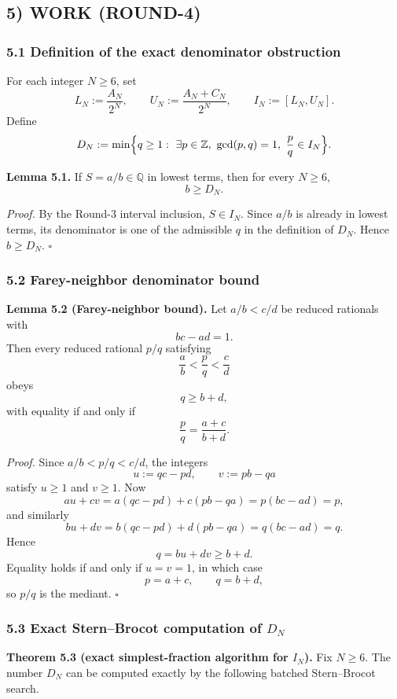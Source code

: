 \subsection*{5) WORK (ROUND-4)}

\subsubsection*{5.1 Definition of the exact denominator obstruction}

For each integer $N\ge 6$, set
\[
L_N:=\frac{A_N}{2^N},\qquad U_N:=\frac{A_N+C_N}{2^N},
\qquad I_N:=[L_N,U_N].
\]
Define
\[
D_N:=\min\Bigl\{q\ge 1:\ \exists p\in\mathbb Z,\ \gcd(p,q)=1,\ \frac pq\in I_N\Bigr\}.
\]

\medskip
\noindent\textbf{Lemma 5.1.}
If $S=a/b\in\mathbb Q$ in lowest terms, then for every $N\ge 6$,
\[
b\ge D_N.
\]

\emph{Proof.}
By the Round-3 interval inclusion, $S\in I_N$. Since $a/b$ is already in lowest terms, its denominator is one of the admissible $q$ in the definition of $D_N$. Hence $b\ge D_N$. \hfill$\square$

\subsubsection*{5.2 Farey-neighbor denominator bound}

\textbf{Lemma 5.2 (Farey-neighbor bound).}
Let $a/b<c/d$ be reduced rationals with
\[
bc-ad=1.
\]
Then every reduced rational $p/q$ satisfying
\[
\frac ab<\frac pq<\frac cd
\]
obeys
\[
q\ge b+d,
\]
with equality if and only if
\[
\frac pq=\frac{a+c}{b+d}.
\]

\emph{Proof.}
Since $a/b<p/q<c/d$, the integers
\[
u:=qc-pd,\qquad v:=pb-qa
\]
satisfy $u\ge 1$ and $v\ge 1$. Now
\[
a u + c v
= a(qc-pd)+c(pb-qa)
= p(bc-ad)
= p,
\]
and similarly
\[
b u + d v
= b(qc-pd)+d(pb-qa)
= q(bc-ad)
= q.
\]
Hence
\[
q=bu+dv\ge b+d.
\]
Equality holds if and only if $u=v=1$, in which case
\[
p=a+c,\qquad q=b+d,
\]
so $p/q$ is the mediant. \hfill$\square$

\subsubsection*{5.3 Exact Stern--Brocot computation of $D_N$}

\textbf{Theorem 5.3 (exact simplest-fraction algorithm for $I_N$).}
Fix $N\ge 6$. The number $D_N$ can be computed exactly by the following batched Stern--Brocot search.


